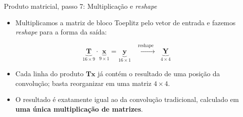 \documentclass[aspectratio=169,xcolor=dvipsnames]{beamer}
\begin{document}
\begin{frame}{Produto matricial, passo 7: Multiplicação e \textit{reshape}}
\begin{itemize}
    \item Multiplicamos a matriz de bloco Toeplitz pelo vetor de entrada e fazemos \textit{reshape} para a forma da saída:
\end{itemize}
\begin{equation*}
    \underbrace{\mathbf{T}}_{16 \times 9} \cdot \underbrace{\mathbf{x}}_{9 \times 1} = \underbrace{\mathbf{y}}_{16 \times 1}
    \;\;\xrightarrow{\;\text{reshape}\;}\;\;
    \underbrace{\mathbf{Y}}_{4 \times 4}
\end{equation*}
\begin{itemize}
    \item Cada linha do produto $\mathbf{T}\mathbf{x}$ já contém o resultado de uma posição da convolução; basta reorganizar em uma matriz $4\times 4$.
    \item O resultado é exatamente igual ao da convolução tradicional, calculado em \textbf{uma única multiplicação de matrizes}.
\end{itemize}
\end{frame}
\end{document}
